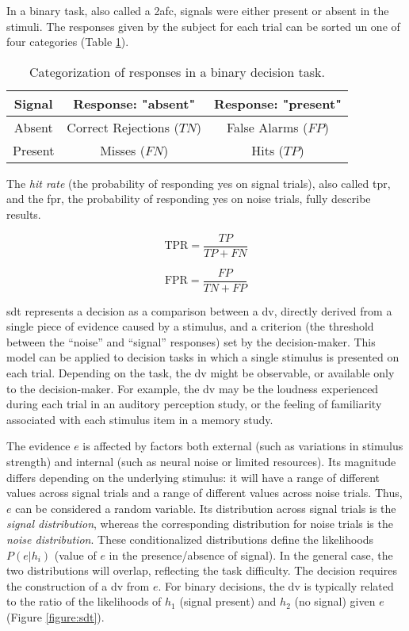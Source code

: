 In a binary task, also called a \acrfull{2afc}, signals were either present or absent in the stimuli. The responses given by the subject for each trial can be sorted un one of four categories (Table \ref{table:1}).

\begin{table}[h!]
    \centering
    \begin{tabular}{ ||c||c|c|| }
        \hline
        Signal  & Response: "absent"        & Response: "present" \\
        \hline\hline
        Absent  & Correct Rejections ($TN$) & False Alarms ($FP$) \\
        \hline
        Present & Misses ($FN$)             & Hits ($TP$)         \\
        \hline
    \end{tabular}
    \caption{Categorization of responses in a binary decision task.}
    \label{table:1}
\end{table}

The \textit{hit rate} (the probability of responding yes on signal trials), also called \acrfull{tpr}, and the \acrfull{fpr}, the probability of responding yes on noise trials, fully describe results.

$$\text{TPR} = \frac{TP}{TP + FN}$$

$$\text{FPR} = \frac{FP}{TN+FP}$$

\acrshort{sdt} represents a decision as a comparison between a \acrfull{dv}, directly derived from a single piece of evidence caused by a stimulus, and a criterion (the threshold between the “noise” and “signal” responses) set by the decision-maker. This model can be applied to decision tasks in which a single stimulus is presented on each trial. Depending on the task, the \acrshort{dv} might be observable, or available only to the decision-maker. For example, the \acrshort{dv} may be the loudness experienced during each trial in an auditory perception study, or the feeling of familiarity associated with each stimulus item in a memory study.

The evidence $e$ is affected by factors both external (such as variations in stimulus strength) and internal (such as neural noise or limited resources). Its magnitude differs depending on the underlying stimulus: it will have a range of different values across signal trials and a range of different values across noise trials. Thus, $e$ can be considered a random variable. Its distribution across signal trials is the \textit{signal distribution}, whereas the corresponding distribution for noise trials is the \textit{noise distribution}. These conditionalized distributions define the likelihoods $P(e|h_i)$ (value of $e$ in the presence/absence of signal). In the general case, the two distributions will overlap, reflecting the task difficulty. The decision requires the construction of a \acrlong{dv} from $e$. For binary decisions, the \acrshort{dv} is typically related to the ratio of the likelihoods of $h_1$ (signal present) and $h_2$ (no signal) given $e$ (Figure \ref{figure:sdt}).

